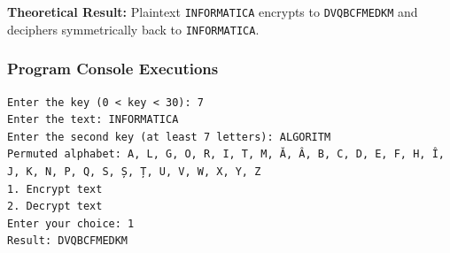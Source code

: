 \documentclass[12pt,a4paper]{article}
\begin{document}
\begin{table}[H]
\centering
\caption{Mathematical step-by-step verification of Task 2 encryption and decryption}
\label{tab:task2_math}
\end{table}

\noindent
\textbf{Theoretical Result:} Plaintext \texttt{INFORMATICA} encrypts to \texttt{DVQBCFMEDKM} and deciphers symmetrically back to \texttt{INFORMATICA}.

\subsubsection{Program Console Executions}

\begin{lstlisting}[caption={Task 2 Encryption Execution}]
Enter the key (0 < key < 30): 7
Enter the text: INFORMATICA
Enter the second key (at least 7 letters): ALGORITM
Permuted alphabet: A, L, G, O, R, I, T, M, Ă, Â, B, C, D, E, F, H, Î, J, K, N, P, Q, S, Ș, Ț, U, V, W, X, Y, Z
1. Encrypt text
2. Decrypt text
Enter your choice: 1
Result: DVQBCFMEDKM
\end{lstlisting}
\end{document}
